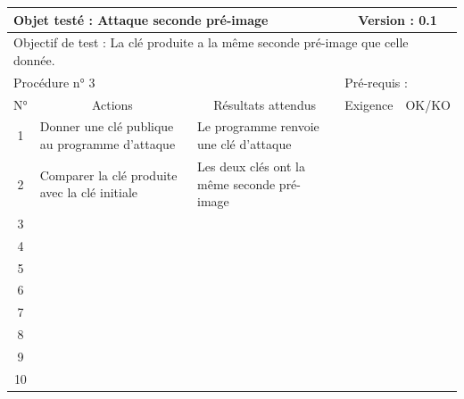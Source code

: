 \documentclass{../res/univ-projet}
\begin{document}
\begin{center}
    \begin{tabular}{|c|p{5cm}|p{5cm}|p{1.5cm}|p{1.5cm}|}
      \hline
      \multicolumn{3}{|l|}{Objet testé : Attaque seconde pré-image} & \multicolumn{2}{c|}{Version : 0.1}\\ \hline
      \multicolumn{5}{|l|}{Objectif de test : La clé produite a la même seconde pré-image que celle donnée.}\\ \hline
      \multicolumn{3}{|l|}{Procédure n° 3} & \multicolumn{2}{p{3cm}|}{Pré-requis : }\\ \hline
      \multicolumn{1}{|c|}{N°} & \multicolumn{1}{c|}{Actions} & \multicolumn{1}{c|}{Résultats attendus} & 
      \multicolumn{1}{c|}{Exigence} & \multicolumn{1}{c|}{OK/KO}\\ \hline
      1 & Donner une clé publique au programme d'attaque & Le programme renvoie une clé d'attaque &  & \\
      2 & Comparer la clé produite avec la clé initiale & Les deux clés ont la même seconde pré-image &  & \\
      3 &  &  &  & \\ 
	  4 &  &  &  & \\
      5 &  &  &  & \\
	  6 &  &  &  & \\
      7 &  &  &  & \\
      8 &  &  &  & \\
      9 &  &  &  & \\
      10 &  &  &  &\\ 
	\hline
    \end{tabular}
    \vskip 2.2cm




\end{center}
\end{document}
